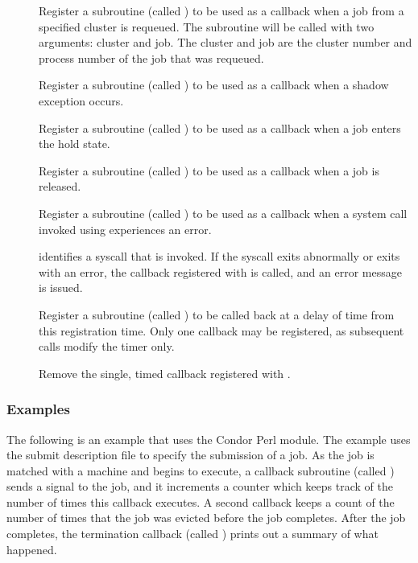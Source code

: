 \begin{description}
  \item []
  Register a subroutine (called )
  to be used as a callback when a job from
  a specified cluster is requeued.  The subroutine will be
  called with two arguments: cluster and job. The cluster
  and job are the cluster number and process number of the job that
  was requeued.

  \item []
  Register a subroutine (called )
  to be used as a callback when a shadow exception occurs.

  \item []
  Register a subroutine (called )
  to be used as a callback when a job enters the hold state.

  \item []
  Register a subroutine (called )
  to be used as a callback when a job is released.

  \item []
  Register a subroutine (called )
  to be used as a callback when a system call invoked using 
  experiences an error.

  \item []
   identifies a syscall that is invoked.
  If the syscall exits abnormally or exits with an error, the callback
  registered with  is called, and
  an error message is issued.

  \item []
  Register a subroutine (called )
  to be called back at a delay of  time from
  this registration time.  Only one callback may be registered,
  as subsequent calls modify the timer only.

  \item []
  Remove the single, timed callback registered with .

\end{description}


\subsubsection{Examples}

The following is an example that uses the Condor Perl module.
The example uses the submit description file 
 to specify the submission of a job.
As the job is matched with a machine and begins to execute,
a callback  subroutine (called \verb@execute@)
sends a  signal to the job,
and it increments a counter which keeps track of the
number of times this callback executes.
A second callback keeps a count of the number of times
that the job was evicted before the job completes.
After the job completes, the termination
callback (called \verb@normal@) prints out a summary of what happened.

